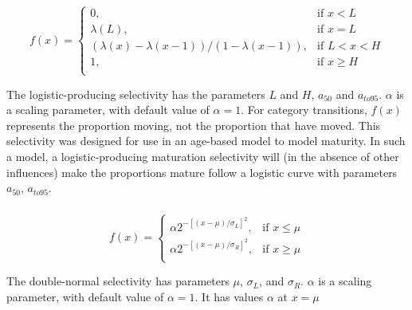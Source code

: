 \subsubsection[Logistic producing]{}

\begin{equation} 
f(x)=\begin{cases}
	  0, & \text{if $x < L$} \\
	  \lambda(L), & \text{if $x=L$} \\
	  \left( \lambda(x)-\lambda(x-1) \right) / \left( 1-\lambda(x-1) \right), & \text{if $L < x < H$} \\
	  1, & \text{if $x \ge H$} \\  
  \end{cases}
\end{equation}

The logistic-producing selectivity has the parameters $L$ and $H$, $a_{50}$ and $a_{to95}$. $\alpha$ is a scaling parameter, with default value of $\alpha = 1$. For category transitions, $f(x)$ represents the proportion moving, not the proportion that have moved. This selectivity was designed for use in an age-based model to model maturity. In such a model, a logistic-producing maturation selectivity will (in the absence of other influences) make the proportions mature follow a logistic curve with parameters $a_{50}$, $a_{to95}$.

\subsubsection[Double-normal]{}

\begin{equation}
  f(x) = \begin{cases}
    \alpha 2^{-[(x- \mu)/\sigma_L ]^2}, & \text{if $x \leq \mu$} \\
    \alpha 2^{-[(x- \mu)/\sigma_R ]^2}, & \text{if $x \ge \mu$}\\
  \end{cases}
\end{equation} 

The double-normal selectivity has parameters $\mu$, $\sigma_L$, and $\sigma_R$. $\alpha$ is a scaling parameter, with default value of $\alpha = 1$. It has values $\alpha$ at $x=\mu$

\subsubsection[Double-exponential]{}

